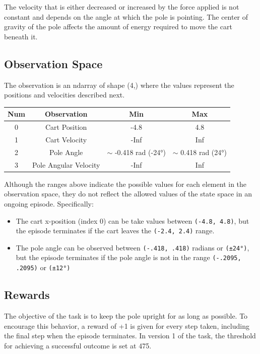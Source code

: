 \documentclass{article} %
\begin{document}
The velocity that is either decreased or increased by the force applied is not constant
and depends on the angle at which the pole is pointing. The center of gravity of the pole
affects the amount of energy required to move the cart beneath it.

\subsection{Observation Space}

The observation is an ndarray of shape (4,) where the values represent the positions and
velocities described next.

\begin{center}
    \begin{tabular}{cccc}
        \toprule
        Num & Observation & Min & Max \\
        \midrule
        0 & Cart Position & -4.8 & 4.8 \\
        1 & Cart Velocity & -Inf & Inf \\
        2 & Pole Angle & $\sim$ -0.418 rad (-24°) & $\sim$ 0.418 rad (24°) \\
        3 & Pole Angular Velocity & -Inf & Inf \\
        \bottomrule
    \end{tabular}
\end{center}

Although the ranges above indicate the possible values for each element in the observation
space, they do not reflect the allowed values of the state space in an ongoing episode.
Specifically:

\begin{itemize}
    \item The cart x-position (index 0) can be take values between \verb|(-4.8, 4.8)|,
    but the episode terminates if the cart leaves the \verb|(-2.4, 2.4)| range.
    \item The pole angle can be observed between \verb|(-.418, .418)| radians
    or \verb|(±24°)|, but the
    episode terminates if the pole angle is not in the range \verb|(-.2095, .2095)|
    or \verb|(±12°)|
\end{itemize}

\subsection{Rewards}

The objective of the task is to keep the pole upright for as long as possible. To encourage
this behavior, a reward of +1 is given for every step taken, including the final step when
the episode terminates. In version 1 of the task, the threshold for achieving a successful
outcome is set at 475.
\end{document}
